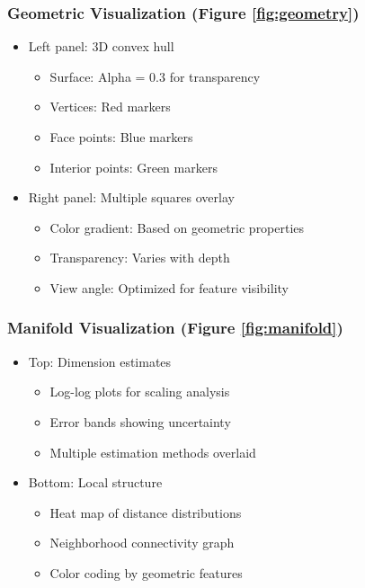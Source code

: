 \documentclass[11pt]{article}
\begin{document}
\subsubsection{Geometric Visualization (Figure \ref{fig:geometry})}
\begin{itemize}
    \item Left panel: 3D convex hull
    \begin{itemize}
        \item Surface: Alpha = 0.3 for transparency
        \item Vertices: Red markers
        \item Face points: Blue markers
        \item Interior points: Green markers
    \end{itemize}
    \item Right panel: Multiple squares overlay
    \begin{itemize}
        \item Color gradient: Based on geometric properties
        \item Transparency: Varies with depth
        \item View angle: Optimized for feature visibility
    \end{itemize}
\end{itemize}

\subsubsection{Manifold Visualization (Figure \ref{fig:manifold})}
\begin{itemize}
    \item Top: Dimension estimates
    \begin{itemize}
        \item Log-log plots for scaling analysis
        \item Error bands showing uncertainty
        \item Multiple estimation methods overlaid
    \end{itemize}
    \item Bottom: Local structure
    \begin{itemize}
        \item Heat map of distance distributions
        \item Neighborhood connectivity graph
        \item Color coding by geometric features
    \end{itemize}
\end{itemize}
\end{document}
